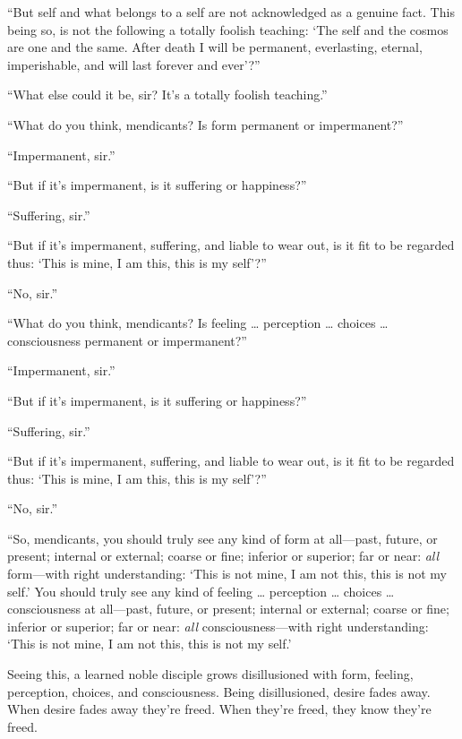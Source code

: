 \documentclass[12pt,openany]{book}%
\begin{document}
“But self and what belongs to a self are not acknowledged as a genuine fact. This being so, is not the following a totally foolish teaching: ‘The self and the cosmos are one and the same. After death I will be permanent, everlasting, eternal, imperishable, and will last forever and ever’?” 

“What else could it be, sir? It’s a totally foolish teaching.” 

“What do you think, mendicants? Is form permanent or impermanent?” 

“Impermanent, sir.” 

“But if it’s impermanent, is it suffering or happiness?” 

“Suffering, sir.” 

“But if it’s impermanent, suffering, and liable to wear out, is it fit to be regarded thus: ‘This is mine, I am this, this is my self’?” 

“No, sir.” 

“What do you think, mendicants? Is feeling … perception … choices … consciousness permanent or impermanent?” 

“Impermanent, sir.” 

“But if it’s impermanent, is it suffering or happiness?” 

“Suffering, sir.” 

“But if it’s impermanent, suffering, and liable to wear out, is it fit to be regarded thus: ‘This is mine, I am this, this is my self’?” 

“No, sir.” 

“So, mendicants, you should truly see any kind of form at all—past, future, or present; internal or external; coarse or fine; inferior or superior; far or near: \emph{all} form—with right understanding: ‘This is not mine, I am not this, this is not my self.’ You should truly see any kind of feeling … perception … choices … consciousness at all—past, future, or present; internal or external; coarse or fine; inferior or superior; far or near: \emph{all} consciousness—with right understanding: ‘This is not mine, I am not this, this is not my self.’ 

Seeing this, a learned noble disciple grows disillusioned with form, feeling, perception, choices, and consciousness. Being disillusioned, desire fades away. When desire fades away they’re freed. When they’re freed, they know they’re freed. 
\end{document}
